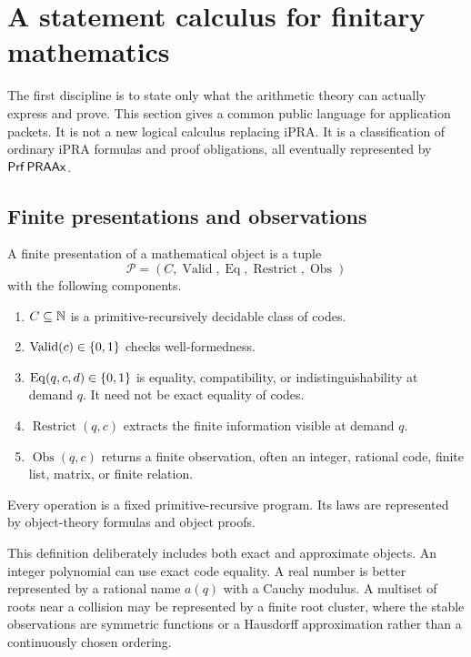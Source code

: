 \section{A statement calculus for finitary mathematics}
\label{sec:statements}

The first discipline is to state only what the arithmetic theory can actually express and prove.  This
section gives a common public language for application packets.  It is not a new logical calculus replacing
iPRA.  It is a classification of ordinary iPRA formulas and proof obligations, all eventually represented
by \(\mathsf{Prf}\,\mathsf{PRAAx}\).

\subsection{Finite presentations and observations}

\begin{definition}
A finite presentation of a mathematical object is a tuple
\[
  \mathcal P=(C,\operatorname{Valid},\operatorname{Eq},\operatorname{Restrict},\operatorname{Obs})
\]
with the following components.
\begin{enumerate}
  \item \(C\subseteq\mathbb N\) is a primitive-recursively decidable class of codes.
  \item \(\operatorname{Valid}(c)\in\{0,1\}\) checks well-formedness.
  \item \(\operatorname{Eq}(q,c,d)\in\{0,1\}\) is equality, compatibility, or indistinguishability at
        demand \(q\).  It need not be exact equality of codes.
  \item \(\operatorname{Restrict}(q,c)\) extracts the finite information visible at demand \(q\).
  \item \(\operatorname{Obs}(q,c)\) returns a finite observation, often an integer, rational code,
        finite list, matrix, or finite relation.
\end{enumerate}
Every operation is a fixed primitive-recursive program.  Its laws are represented by object-theory
formulas and object proofs.
\end{definition}

This definition deliberately includes both exact and approximate objects.  An integer polynomial can use
exact code equality.  A real number is better represented by a rational name \(a(q)\) with a Cauchy
modulus.  A multiset of roots near a collision may be represented by a finite root cluster, where the
stable observations are symmetric functions or a Hausdorff approximation rather than a continuously
chosen ordering.

